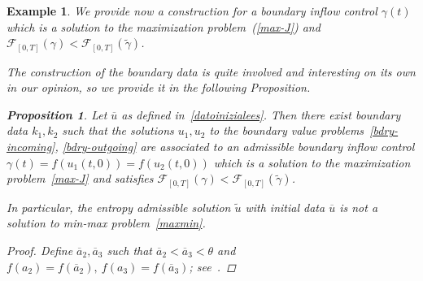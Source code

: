 \documentclass[a4paper, 10pt, final]{article}
\newtheorem{example}{Example}[section]
\newtheorem{proposition}{Proposition}[section]
\begin{document}
\begin{example}
 

  We provide now a construction for a boundary inflow control  $\gamma(t)$ which is a solution
  to the maximization problem~(\ref{max-J}) and 
  $\mathcal{F}_{[0,T]} (\gamma) < \mathcal{F}_{[0,T]} (\widetilde \gamma)$. 

  The construction  of the boundary data is quite involved and interesting on its own in our opinion, 
  so  we   provide it in the following Proposition. 
  \begin{proposition}
    \label{propesempiofabio}
    Let $\overline u$ as defined in~\eqref{datoinizialees}. 
    Then there exist boundary data $k_1, k_2$ such that the solutions $u_1, u_2$ 
    to the boundary value problems~\eqref{bdry-incoming}, \eqref{bdry-outgoing} 
    are associated to an admissible boundary inflow control $\gamma(t)= f(u_1(t, 0))=f(u_2(t,0))$  which 
    is a solution 
    to the maximization problem~\eqref{max-J} and satisfies 
    $\mathcal{F}_{[0,T]} (\gamma) < \mathcal{F}_{[0,T]} (\widetilde \gamma)$.

    In particular, the entropy admissible solution $\widetilde u$ with initial data 
    $\overline u$ is not a solution to min-max problem~\eqref{maxmin}.
  \end{proposition}

  \begin{proof} Define $\overline{a}_2, \overline a_3 $ such that $\overline a_2 < \overline a_3<\theta$ 
    and $f(a_2) = f(\overline{a}_2),\ f(a_3) = f(\overline{a}_3)$; see~.


\end{proof}
\end{example}
\end{document}
